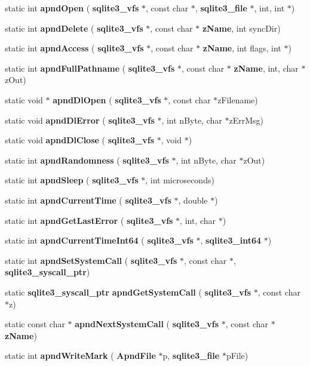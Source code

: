 \begin{DoxyCompactItemize}
\item 
static int \textbf{ apnd\+Open} (\textbf{ sqlite3\+\_\+vfs} $\ast$, const char $\ast$, \textbf{ sqlite3\+\_\+file} $\ast$, int, int $\ast$)
\item 
static int \textbf{ apnd\+Delete} (\textbf{ sqlite3\+\_\+vfs} $\ast$, const char $\ast$\textbf{ z\+Name}, int sync\+Dir)
\item 
static int \textbf{ apnd\+Access} (\textbf{ sqlite3\+\_\+vfs} $\ast$, const char $\ast$\textbf{ z\+Name}, int flags, int $\ast$)
\item 
static int \textbf{ apnd\+Full\+Pathname} (\textbf{ sqlite3\+\_\+vfs} $\ast$, const char $\ast$\textbf{ z\+Name}, int, char $\ast$z\+Out)
\item 
static void $\ast$ \textbf{ apnd\+Dl\+Open} (\textbf{ sqlite3\+\_\+vfs} $\ast$, const char $\ast$z\+Filename)
\item 
static void \textbf{ apnd\+Dl\+Error} (\textbf{ sqlite3\+\_\+vfs} $\ast$, int n\+Byte, char $\ast$z\+Err\+Msg)
\item 
static void \textbf{ apnd\+Dl\+Close} (\textbf{ sqlite3\+\_\+vfs} $\ast$, void $\ast$)
\item 
static int \textbf{ apnd\+Randomness} (\textbf{ sqlite3\+\_\+vfs} $\ast$, int n\+Byte, char $\ast$z\+Out)
\item 
static int \textbf{ apnd\+Sleep} (\textbf{ sqlite3\+\_\+vfs} $\ast$, int microseconds)
\item 
static int \textbf{ apnd\+Current\+Time} (\textbf{ sqlite3\+\_\+vfs} $\ast$, double $\ast$)
\item 
static int \textbf{ apnd\+Get\+Last\+Error} (\textbf{ sqlite3\+\_\+vfs} $\ast$, int, char $\ast$)
\item 
static int \textbf{ apnd\+Current\+Time\+Int64} (\textbf{ sqlite3\+\_\+vfs} $\ast$, \textbf{ sqlite3\+\_\+int64} $\ast$)
\item 
static int \textbf{ apnd\+Set\+System\+Call} (\textbf{ sqlite3\+\_\+vfs} $\ast$, const char $\ast$, \textbf{ sqlite3\+\_\+syscall\+\_\+ptr})
\item 
static \textbf{ sqlite3\+\_\+syscall\+\_\+ptr} \textbf{ apnd\+Get\+System\+Call} (\textbf{ sqlite3\+\_\+vfs} $\ast$, const char $\ast$z)
\item 
static const char $\ast$ \textbf{ apnd\+Next\+System\+Call} (\textbf{ sqlite3\+\_\+vfs} $\ast$, const char $\ast$\textbf{ z\+Name})
\item 
static int \textbf{ apnd\+Write\+Mark} (\textbf{ Apnd\+File} $\ast$p, \textbf{ sqlite3\+\_\+file} $\ast$p\+File)

\end{DoxyCompactItemize}
